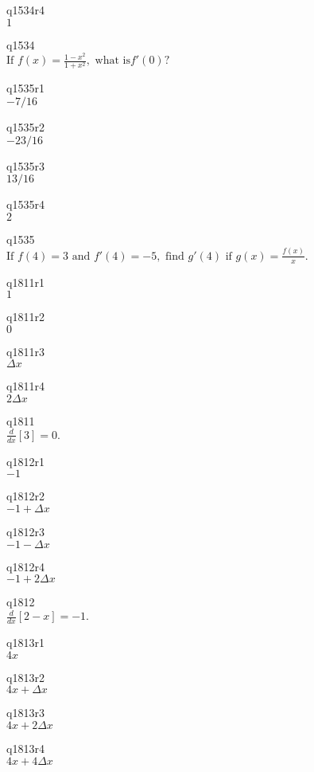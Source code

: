 q1534r4\\
\(\displaystyle 1 \)

q1534\\
\(\displaystyle \text{If } f(x) = \frac{1-x^2}{1+x^2}, \text{ what is} f'(0)? \)

q1535r1\\
\(\displaystyle -7/16 \)

q1535r2\\
\(\displaystyle -23/16 \)

q1535r3\\
\(\displaystyle 13/16 \)

q1535r4\\
\(\displaystyle 2 \)

q1535\\
\(\displaystyle \text{If } f(4) = 3 \text{ and } f'(4) = -5, \text{ find } g'(4) \text{ if } g(x) = \frac{f(x)}{x}. \)

q1811r1\\
\(\displaystyle 1 \)

q1811r2\\
\(\displaystyle 0 \)

q1811r3\\
\(\displaystyle \Delta x \)

q1811r4\\
\(\displaystyle 2\Delta x \)

q1811\\
\(\displaystyle \frac{d}{dx} [3] = 0. \)

q1812r1\\
\(\displaystyle -1 \)

q1812r2\\
\(\displaystyle -1 + \Delta x \)

q1812r3\\
\(\displaystyle -1 - \Delta x \)

q1812r4\\
\(\displaystyle -1 + 2 \Delta x \)

q1812\\
\(\displaystyle \frac{d}{dx} [2-x] = -1. \)

q1813r1\\
\(\displaystyle 4x \)

q1813r2\\
\(\displaystyle 4x + \Delta x \)

q1813r3\\
\(\displaystyle 4x + 2\Delta x \)

q1813r4\\
\(\displaystyle 4x + 4\Delta x \)


